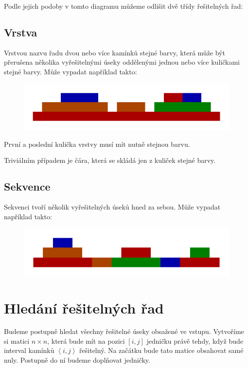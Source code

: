 \documentclass{article}
\begin{document}
Podle jejich podoby v tomto diagramu můžeme odlišit dvě třídy řešitelných řad:

\subsection{Vrstva}

Vrstvou nazvu řadu dvou nebo více kamínků stejné barvy, která může být přerušena několika vyřešitelnými úseky oddělenými jednou nebo více kuličkami stejné barvy. Může vypadat například takto:

\begin{figure}[H]
    \centering
    \includegraphics[scale=1]{layer.pdf}
\end{figure}

První a poslední kulička vrstvy musí mít nutně stejnou barvu.

Triviálním případem je čára, která se skládá jen z kuliček stejné barvy.

\subsection{Sekvence}

Sekvenci tvoří několik vyřešitelných úseků hned za sebou. Může vypadat například takto:

\begin{figure}[H]
    \centering
    \includegraphics[scale=1]{sequence.pdf}
\end{figure}

\section{Hledání řešitelných řad}
\label{section:search}

Budeme postupně hledat všechny řešitelné úseky obsažené ve vstupu. Vytvoříme si matici $n \times n$, která bude mít na pozici $\left[i, j\right]$ jedničku právě tehdy, když bude interval kamínků $\left<i, j\right>$ řešitelný. Na začátku bude tato matice obsahovat samé nuly. Postupně do ní budeme doplňovat jedničky.
\end{document}

